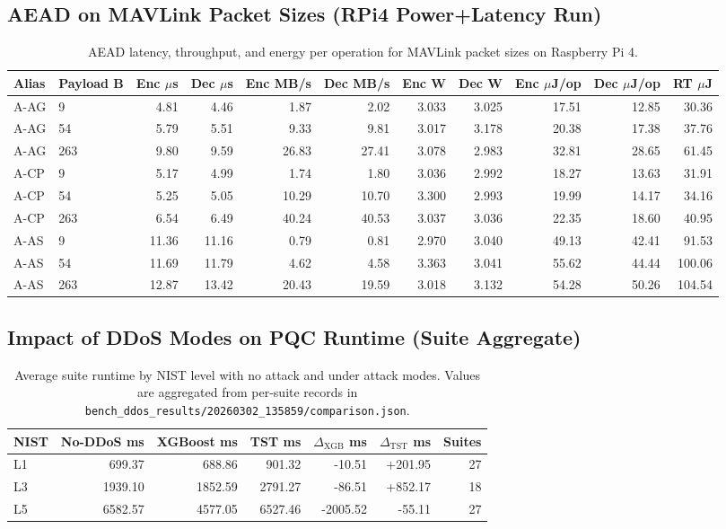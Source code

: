 \subsection{AEAD on MAVLink Packet Sizes (RPi4 Power+Latency Run)}
\begin{table}[t]
\centering
\caption{AEAD latency, throughput, and energy per operation for MAVLink packet sizes on Raspberry Pi 4.}
\footnotesize
\setlength{\tabcolsep}{2.6pt}
\begin{tabular}{@{}llrrrrrrrrr@{}}\toprule
Alias & Payload B & Enc $\mu$s & Dec $\mu$s & Enc MB/s & Dec MB/s & Enc W & Dec W & Enc $\mu$J/op & Dec $\mu$J/op & RT $\mu$J \\ \midrule
A-AG & 9 & 4.81 & 4.46 & 1.87 & 2.02 & 3.033 & 3.025 & 17.51 & 12.85 & 30.36 \\
A-AG & 54 & 5.79 & 5.51 & 9.33 & 9.81 & 3.017 & 3.178 & 20.38 & 17.38 & 37.76 \\
A-AG & 263 & 9.80 & 9.59 & 26.83 & 27.41 & 3.078 & 2.983 & 32.81 & 28.65 & 61.45 \\
A-CP & 9 & 5.17 & 4.99 & 1.74 & 1.80 & 3.036 & 2.992 & 18.27 & 13.63 & 31.91 \\
A-CP & 54 & 5.25 & 5.05 & 10.29 & 10.70 & 3.300 & 2.993 & 19.99 & 14.17 & 34.16 \\
A-CP & 263 & 6.54 & 6.49 & 40.24 & 40.53 & 3.037 & 3.036 & 22.35 & 18.60 & 40.95 \\
A-AS & 9 & 11.36 & 11.16 & 0.79 & 0.81 & 2.970 & 3.040 & 49.13 & 42.41 & 91.53 \\
A-AS & 54 & 11.69 & 11.79 & 4.62 & 4.58 & 3.363 & 3.041 & 55.62 & 44.44 & 100.06 \\
A-AS & 263 & 12.87 & 13.42 & 20.43 & 19.59 & 3.018 & 3.132 & 54.28 & 50.26 & 104.54 \\
\bottomrule\end{tabular}
\label{tab:aead-mavlink-power-latency}
\end{table}

\subsection{Impact of DDoS Modes on PQC Runtime (Suite Aggregate)}
\begin{table}[t]
\centering
\caption{Average suite runtime by NIST level with no attack and under attack modes. Values are aggregated from per-suite records in \texttt{bench\_ddos\_results/20260302\_135859/comparison.json}.}
\footnotesize
\setlength{\tabcolsep}{4pt}
\begin{tabular}{@{}lrrrrrr@{}}\toprule
NIST & No-DDoS ms & XGBoost ms & TST ms & $\Delta_{\text{XGB}}$ ms & $\Delta_{\text{TST}}$ ms & Suites \\ \midrule
L1 & 699.37 & 688.86 & 901.32 & -10.51 & +201.95 & 27 \\
L3 & 1939.10 & 1852.59 & 2791.27 & -86.51 & +852.17 & 18 \\
L5 & 6582.57 & 4577.05 & 6527.46 & -2005.52 & -55.11 & 27 \\
\bottomrule\end{tabular}
\label{tab:ddos-impact-on-pqc}
\end{table}

